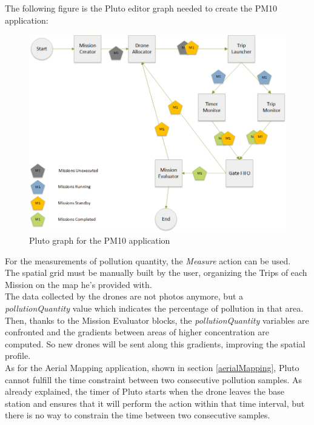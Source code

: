 The following figure is the Pluto editor graph needed to create the PM10 application:

\begin{figure}[H]
  \centering
  \includegraphics[width=\linewidth]{pictures/Putti_Diagram.png}
  \caption{Pluto graph for the PM10 application}
  \label{fig:pm10Graph}
\end{figure}


For the measurements of pollution quantity, the \textit{Measure} action can be used.
\\

The spatial grid must be manually built by the user, organizing the Trips of each Mission on the map he's provided with.
\\

The data collected by the drones are not photos anymore, but a \textit{pollutionQuantity} value which indicates the percentage of pollution in that area.
\\

Then, thanks to the Mission Evaluator blocks, the \textit{pollutionQuantity} variables are confronted and the gradients between areas of higher concentration are computed.
So new drones will be sent along this gradients, improving the spatial profile.
\\

As for the Aerial Mapping application, shown in section \ref{aerialMapping}, Pluto cannot fulfill the time constraint between two consecutive pollution samples.
As already explained, the timer of Pluto starts when the drone leaves the base station and ensures that it will perform the action within that time interval, but there is no way to constrain the time between two consecutive samples.
\\

